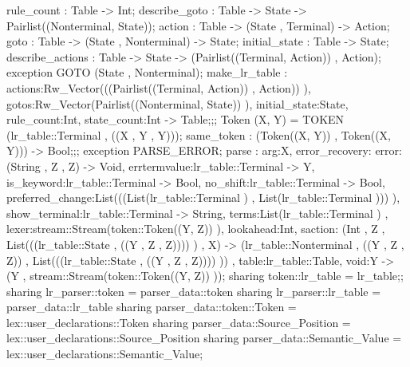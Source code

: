 {{{{                                        rule_count : Table -> Int;
                                        describe_goto : Table -> State -> Pairlist((Nonterminal, State));
                                        action : Table -> (State , Terminal) -> Action;
                                        goto : Table -> (State , Nonterminal) -> State;
                                        initial_state : Table -> State;
                                        describe_actions : Table -> State -> (Pairlist((Terminal, Action)) , Action);
                                        exception GOTO (State , Nonterminal);
                                            make_lr_table :
                                                    {actions:Rw_Vector(((Pairlist((Terminal, Action)) , Action)) ),
                                                    gotos:Rw_Vector(Pairlist((Nonterminal, State)) ), initial_state:State, rule_count:Int,
                                                    state_count:Int}
                                                ->
                                                Table;};;
                            Token (X, Y) = TOKEN (lr_table::Terminal , ((X , Y , Y)));
                            same_token : (Token((X, Y)) , Token((X, Y))) -> Bool;};;
                exception PARSE_ERROR;
                    parse : {arg:X,
                            error_recovery:
                                {error:(String , Z , Z) -> Void, errtermvalue:lr_table::Terminal -> Y,
                                is_keyword:lr_table::Terminal -> Bool, no_shift:lr_table::Terminal -> Bool,
                                preferred_change:List(((List(lr_table::Terminal ) , List(lr_table::Terminal ))) ),
                                show_terminal:lr_table::Terminal -> String, terms:List(lr_table::Terminal )}
                            , lexer:stream::Stream(token::Token((Y, Z)) ), lookahead:Int,
                            saction:
                            (Int , Z , List(((lr_table::State , ((Y , Z , Z)))) ) , X)
                            ->
                            (lr_table::Nonterminal , ((Y , Z , Z)) , List(((lr_table::State , ((Y , Z , Z)))) ))
                            , table:lr_table::Table, void:Y}
                        ->
                        (Y , stream::Stream(token::Token((Y, Z)) ));
            sharing token::lr_table = lr_table};;
    sharing lr_parser::token = parser_data::token
    sharing lr_parser::lr_table = parser_data::lr_table
    sharing parser_data::token::Token = lex::user_declarations::Token
    sharing parser_data::Source_Position = lex::user_declarations::Source_Position
    sharing parser_data::Semantic_Value = lex::user_declarations::Semantic_Value};
